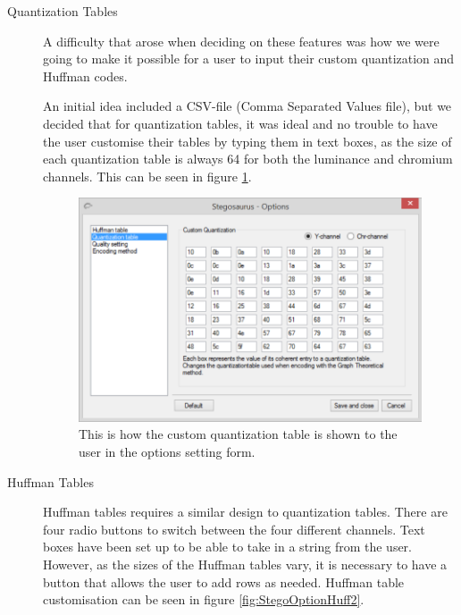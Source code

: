 \begin{description}
\item[Quantization Tables]
A difficulty that arose when deciding on these features was how we were going to make it possible for a user to input their custom quantization and Huffman codes.

An initial idea included a CSV-file (Comma Separated Values file), but we decided that for quantization tables, it was ideal and no trouble to have the user customise their tables by typing them in text boxes, as the size of each quantization table is always 64 for both the luminance and chromium channels. This can be seen in figure \ref{fig:StegoOptionQuant}.


\begin{figure}[H]
	\centering
	\includegraphics[width=1\textwidth]{figures/StegoOptionQuant.png}
	\caption{This is how the custom quantization table is shown to the user in the options setting form.}
	\label{fig:StegoOptionQuant}
\end{figure}

\item[Huffman Tables]

Huffman tables requires a similar design to quantization tables. There are four radio buttons to switch between the four different channels. Text boxes have been set up to be able to take in a string from the user. However, as the sizes of the Huffman tables vary, it is necessary to have a button that allows the user to add rows as needed. Huffman table customisation can be seen in figure \ref{fig:StegoOptionHuff2}.


\end{description}
